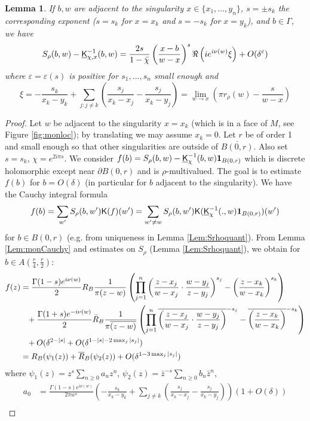\documentclass[10pt]{article}
\newcommand{\eps}{\varepsilon}
\newcommand{\ind}{{\bf 1}}
\newcommand{\rK}{{\sf K}}
\newcommand{\uK}{{\underline {\sf K}}}
\newtheorem{Lem}[thm]{Lemma}
\begin{document}
\begin{Lem}\label{Lem:monrobin}
If $b,w$ are adjacent to the singularity $x\in\{x_1,\dots,y_n\}$, $s=\pm s_k$ the corresponding exponent ($s=s_k$ for $x=x_k$ and $s=-s_k$ for $x=y_k$), and $b\in\Gamma$, we have
$$S_\rho(b,w)-\uK_{\chi,x}^{-1}(b,w)=\frac{2s}{1-\bar\chi}\left(\frac{x-b}{w-x}\right)^s\Re\left(ie^{i\nu(w)}\xi\right)%
+O(\delta^\eps)$$
where $\eps=\eps(s)$ is positive for $s_1,\dots,s_n$ small enough and
$$\xi=-\frac{s_k}{x_k-y_k}+\sum_{j:j\neq k}\left(\frac{s_j}{x_k-x_j}-\frac{s_j}{x_k-y_j}\right)=\lim_{w\rightarrow x}\left(\pi r_\rho(w)-\frac s{w-x}\right)$$
\end{Lem}
\begin{proof}
Let $w$ be adjacent to the singularity $x=x_k$ (which is in a face of $M$, see Figure \ref{fig:monloc}); by translating we may assume $x_k=0$. Let $r$ be of order 1 and small enough so that other singularities are outside of $\overline{B(0,r)}$. Also set $s=s_k$, $\chi=e^{2i\pi s}$. We consider $f(b)=S_\rho(b,w)-\uK_{\chi}^{-1}(b,w)\ind_{B(0,r)}$ which is discrete holomorphic except near $\partial B(0,r)$ and is $\rho$-multivalued. The goal is to estimate $f(b)$ for $b=O(\delta)$ (in particular for $b$ adjacent to the singularity). We have the Cauchy integral formula
$$f(b)=\sum_{w'}S_\rho(b,w')\rK(f)(w')=\sum_{w'\neq w}S_\rho(b,w')\rK(\uK_\chi^{-1}(.,w)\ind_{B(0,r)})(w')$$
for $b\in B(0,r)$ (e.g. from uniqueness in Lemma \ref{Lem:Srhoquant}). From Lemma \ref{Lem:monCauchy} and estimates on $S_\rho$ (Lemma \ref{Lem:Srhoquant}), we obtain for $b\in A(\frac r4,\frac r2)$:
\begin{align*}
f(z)&=\frac{\Gamma(1-s)e^{i\nu(w)}}2R_B\frac{1}{\pi(z-w)}\left(
\prod_{j=1}^n\left(\frac{z-x_j}{w-x_j}\cdot\frac{w-y_j}{z-y_j}\right)^{s_j}
-\left(\frac{z-x_k}{w-x_k}\right)^{s_k}\right)\\
&\hphantom{=}+\frac{\Gamma(1+s)e^{-i\nu(w)}}2\bar R_B
\frac{1}{\pi\overline{(z-w)}}\left(
\prod_{j=1}^n\overline{\left(\frac{z-x_j}{w-x_j}\cdot\frac{w-y_j}{z-y_j}\right)}^{-s_j}
-\overline{\left(\frac{z-x_k}{w-x_k}\right)}^{-s_k}
\right)\\
&\hphantom{=}+O(\delta^{2-|s|}+O(\delta^{1-|s|-2\max_j|s_j|})\\
&=R_B(\psi_1(z))+\overline R_B(\psi_2(z))+O(\delta^{1-3\max_j|s_j|})
\end{align*}
where $\psi_1(z)=z^s\sum_{n\geq 0}a_n z^n$, $\psi_2(z)=\bar z^{-s}\sum_{n\geq 0}b_n \bar z^n$,
\begin{align*}
a_0&=\frac{\Gamma(1-s)e^{i\nu(w)}}{2\pi w^s}\left(-\frac{s_k}{x_k-y_k}+\sum_{j\neq k}\left(\frac{s_j}{x_k-x_j}-\frac{s_j}{x_k-y_j}\right)\right)(1+O(\delta))\\

\end{align*}
\end{proof}
\end{document}
